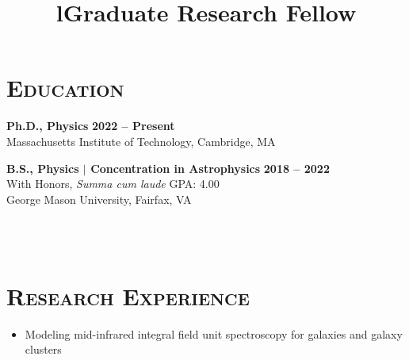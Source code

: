 \documentclass[marg, centered]{res}
\newcommand{\CVItem}[1]{
  \item\small{
    {#1 \vspace{-2pt}}
  }
}
\begin{document}
\begin{resume}

\section{{\scshape \bfseries Education}}
\textbf{Ph.D., Physics} \hfill {\bf 2022 -- Present} \\
Massachusetts Institute of Technology, Cambridge, MA \\
\vspace{-0.7cm}

\textbf{B.S., Physics $\mathbf{|}$ Concentration in Astrophysics} \hfill {\bf 2018 -- 2022}\\
With Honors, \textit{Summa cum laude} \hfill GPA: 4.00 \\
George Mason University, Fairfax, VA

\begin{format}
\title{l}\\
\\
\body
\end{format}

\section{{\scshape \bfseries Research Experience}}
\title{\textbf{Graduate Research Fellow}}
\begin{position}
\vspace{-0.35cm}
\begin{itemize}
    \CVItem{Modeling mid-infrared integral field unit spectroscopy for galaxies and galaxy clusters}
\end{itemize}
\end{position}


\end{resume}
\end{document}
